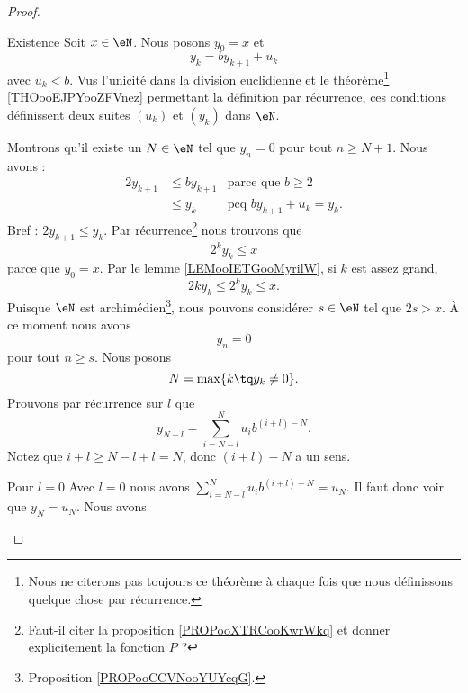 \begin{proof}
\begin{subproof}
		\item[Existence]
		Soit \( x\in \eN\). Nous posons \( y_0=x\) et
		\begin{equation}
			y_k=by_{k+1}+u_k
		\end{equation}
		avec \( u_k<b\). Vus l'unicité dans la division euclidienne et le théorème\footnote{Nous ne citerons pas toujours ce théorème à chaque fois que nous définissons quelque chose par récurrence.} \ref{THOooEJPYooZFVnez} permettant la définition par récurrence, ces conditions définissent deux suites \( (u_k)\) et \( (y_k)\) dans \( \eN\).

		Montrons qu'il existe un \( N\in \eN\) tel que \( y_n=0\) pour tout \( n\geq N+1\). Nous avons :
		\begin{subequations}
			\begin{align}
				2y_{k+1} & \leq b y_{k+1} & \text{parce que } b\geq 2    \\
				         & \leq y_k       & \text{pcq }by_{k+1}+u_k=y_k.
			\end{align}
		\end{subequations}
		Bref : \( 2y_{k+1}\leq y_k\). Par récurrence\footnote{Faut-il citer la proposition \ref{PROPooXTRCooKwrWkq} et donner explicitement la fonction \( P\) ?} nous trouvons que
		\begin{equation}
			2^ky_k\leq x
		\end{equation}
		parce que \( y_0=x\). Par le lemme \ref{LEMooIETGooMyrilW}, si \( k\) est assez grand,
		\begin{equation}
			2ky_k\leq 2^ky_k\leq x.
		\end{equation}
		Puisque \( \eN\) est archimédien\footnote{Proposition \ref{PROPooCCVNooYUYcqG}.}, nous pouvons considérer \( s\in \eN\) tel que \( 2s>x\). À ce moment nous avons
		\begin{equation}
			y_n=0
		\end{equation}
		pour tout \( n\geq s\). Nous posons
		\begin{equation}
			N=\max\{ k\tq y_k\neq 0 \}.
		\end{equation}
		Prouvons par récurrence sur \( l\) que
		\begin{equation}        \label{EQooZBKQooFqcckr}
			y_{N-l}=\sum_{i=N-l}^Nu_ib^{(i+l)-N}.
		\end{equation}
		Notez que \( i+l\geq N-l+l=N\), donc \( (i+l)-N\) a un sens.
		\begin{subproof}
			\item[Pour \( l=0\)]
			Avec \( l=0\) nous avons \( \sum_{i=N-l}^Nu_ib^{(i+l)-N}=u_N\). Il faut donc voir que \( y_N=u_N\). Nous avons

\end{subproof}
\end{subproof}
\end{proof}
